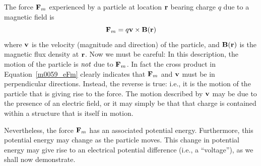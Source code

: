 

\label{m0059_Moving_Conductor_in_a_Static_Magnetic_Field}

The force 
${\bf F}_m$ experienced by a particle at location ${\bf r}$ bearing charge $q$ due to a magnetic field is
%
\begin{equation}
{\bf F}_m = q {\bf v} \times {\bf B}({\bf r}) 
\label{m0059_eFm} 
\end{equation}
%
where 
${\bf v}$ is the velocity (magnitude and direction) of the particle, and
${\bf B}({\bf r})$ is the magnetic flux density at ${\bf r}$.
Now we must be careful: In this description, the motion of the particle is $\emph{not}$ due to ${\bf F}_m$.  In fact the cross product in Equation~\ref{m0059_eFm}  clearly indicates that ${\bf F}_m$ and ${\bf v}$ must be in perpendicular directions.  
Instead, the reverse is true: i.e., it is the motion of the particle that is giving rise to the force.  
The motion described by ${\bf v}$ may be due to the presence of an electric field, or it may simply be that that charge is contained within a structure that is itself in motion.

Nevertheless, the force ${\bf F}_m$ has an associated potential energy.
Furthermore, this potential energy may change as the particle moves.
This change in potential energy may give rise to an electrical potential difference (i.e., a ``voltage''), as we shall now demonstrate. 

